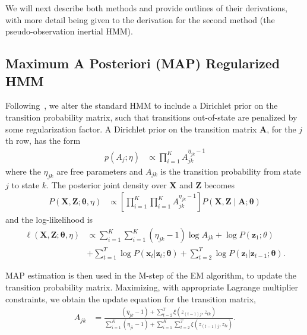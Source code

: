 \documentclass[letterpaper]{article}
\begin{document}
We will next describe both methods and provide outlines of their derivations, with more detail being given to the derivation for the second method (the pseudo-observation inertial HMM).

\subsection{Maximum A Posteriori (MAP) Regularized HMM}

Following~\cite{MAP1994}, we alter the standard HMM to include a Dirichlet prior on the transition probability matrix, such that transitions out-of-state are penalized by some regularization factor. A Dirichlet prior on the transition matrix $\mathbf{A}$, for the $j$th row, has the form
\begin{align*}
    p(A_j; \eta) &\propto \prod_{i=1}^{K} A_{jk}^{\eta_{jk}-1}
\end{align*}
where the $\eta_{jk}$ are free parameters and $A_{jk}$ is the transition probability from state $j$ to state $k$. The posterior joint density over $\mathbf{X}$ and $\mathbf{Z}$ becomes
\begin{align*}
    P(\mathbf{X}, \mathbf{Z} ; \mathbf{\theta}, \eta) 
    &\propto \left[\prod_{i=1}^{K}\prod_{i=1}^{K} A_{jk}^{\eta_{jk} - 1}\right] P(\mathbf{X}, \mathbf{Z} \mid \mathbf{A}; \mathbf{\theta}) 
\end{align*}
and the log-likelihood is
\begin{align*}
\ell(\mathbf{X}, \mathbf{Z} ; \mathbf{\theta}, \eta) 
&\propto \sum_{i=1}^{K}\sum_{i=1}^{K} (\eta_{jk} - 1)\log A_{jk} + \log P(\mathbf{z}_{1}; \theta) \\
&+ \sum_{t=1}^{T}\log P(\mathbf{x}_t|\mathbf{z}_t; \mathbf{\theta}) + \sum_{t=2}^{T}\log P(\mathbf{z}_t|\mathbf{z}_{t-1}; \mathbf{\theta}).
\end{align*}

MAP estimation is then used in the M-step of the EM algorithm, to update the transition probability matrix. Maximizing, with appropriate Lagrange multiplier constraints, we obtain the update equation for the transition matrix, 
\begin{align}
    A_{jk} &= \frac{(\eta_{jk} - 1) + \sum_{t=2}^{T} \xi(z_{(t-1)j}, z_{tk})}   
    {\sum_{i=1}^{K}(\eta_{ji} - 1) + \sum_{i=1}^{K}\sum_{t=2}^{T} \xi(z_{(t-1)j}, z_{ti})}.
\end{align}
\end{document}
